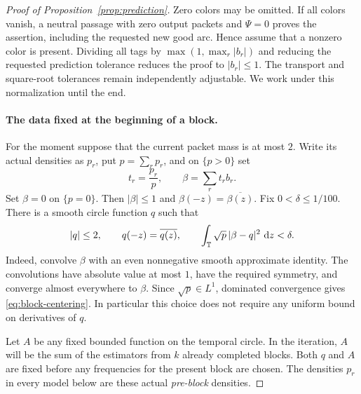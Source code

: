 \begin{proof}[Proof of Proposition~\ref{prop:prediction}]
Zero colors may be omitted.  If all colors vanish, a neutral passage
with zero output packets and $\Psi=0$ proves the assertion, including
the requested new good arc.  Hence assume that a nonzero color is
present.
Dividing all tags by $\max(1,\max_r|b_r|)$ and reducing the requested
prediction tolerance reduces the proof to $|b_r|\le1$.  The transport
and square-root tolerances remain independently adjustable.  We work
under this normalization until the end.

\paragraph{The data fixed at the beginning of a block.}
For the moment suppose that the current packet mass is at most $2$.
Write its actual densities as $p_r$, put $p=\sum_rp_r$, and on
$\{p>0\}$ set
\[
 t_r=\frac{p_r}{p},\qquad
 \beta=\sum_r t_rb_r.
\]
Set $\beta=0$ on $\{p=0\}$.  Then $|\beta|\le1$ and
$\beta(-z)=\overline{\beta(z)}$.  Fix $0<\delta\le1/100$.
There is a smooth circle function $q$ such that
\begin{equation}
 |q|\le2,\qquad q(-z)=\overline{q(z)},\qquad
 \int_\mathbb T\sqrt p\,|\beta-q|^2\,\,\mathrm d z<\delta.
 \label{eq:block-centering}
\end{equation}
Indeed, convolve $\beta$ with an even nonnegative smooth approximate
identity.  The convolutions have absolute value at most $1$, have
the required symmetry, and converge almost everywhere to $\beta$.
Since $\sqrt p\in L^1$, dominated convergence gives
\eqref{eq:block-centering}.  In particular this choice does not require
any uniform bound on derivatives of $q$.

Let $A$ be any fixed bounded function on the temporal circle.  In the
iteration, $A$ will be the sum of the estimators from $k$ already
completed blocks.  Both $q$ and $A$ are fixed before any frequencies
for the present block are chosen.  The densities $p_r$ in every model
below are these actual \emph{pre-block} densities.


\end{proof}
